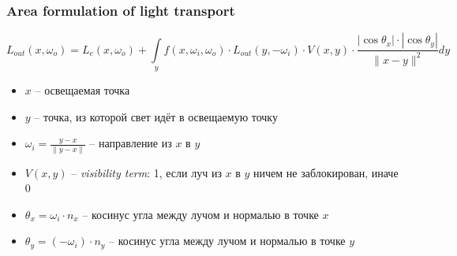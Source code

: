 \documentclass[10pt]{beamer}
\begin{document}
\begin{frame}
\frametitle{Area formulation of light transport}
\begin{equation*}
L_{out}(x, \omega_o) = L_e(x, \omega_o) + \int\limits_y f(x,\omega_i,\omega_o) \cdot L_{out}(y, -\omega_i) \cdot V(x,y)\cdot \frac{|\cos \theta_x| \cdot |\cos \theta_y|}{\|x-y\|^2} dy
\end{equation*}
\pause
\begin{itemize}
\item \begin{math}x\end{math} -- освещаемая точка
\pause
\item \begin{math}y\end{math} -- точка, из которой свет идёт в освещаемую точку
\pause
\item \begin{math}\omega_i = \frac{y-x}{\|y-x\|}\end{math} -- направление из \begin{math}x\end{math} в \begin{math}y\end{math}
\pause
\item \begin{math}V(x,y)\end{math} -- \textit{visibility term}: 1, если луч из \begin{math}x\end{math} в \begin{math}y\end{math} ничем не заблокирован, иначе 0
\pause
\item \begin{math}\theta_x = \omega_i \cdot n_x\end{math} -- косинус угла между лучом и нормалью в точке \begin{math}x\end{math}
\pause
\item \begin{math}\theta_y = (-\omega_i) \cdot n_y\end{math} -- косинус угла между лучом и нормалью в точке \begin{math}y\end{math}
\end{itemize}
\end{frame}
\end{document}
